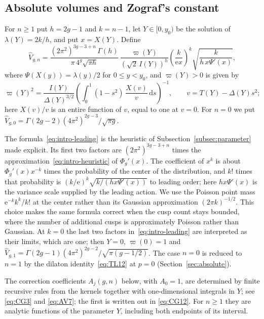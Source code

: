\subsection{Absolute volumes and Zograf's constant}
For $n\ge1$ put $h=2g-1$ and $k=n-1$, let $Y\in[0,y_0)$ be the solution of $\lambda(Y)=2k/h$, and put $x=X(Y)$. Define
\begin{equation}
 \widehat V_{g,n}=\frac{(2\pi^2)^{3g-3+n}\,\Gamma(h)}{\pi\,4^g\sqrt{\pi h}}\,
 \frac{\varpi(Y)}{(\sqrt2\,I(Y))^{h}}
 \left(\frac{k}{\mathrm e x}\right)^{k}
 \sqrt{\frac{k}{h\,x\Psi'(x)}},
 \label{eq:intro-leading}
\end{equation}
where $\Psi(X(y))=\lambda(y)/2$ for $0\le y<y_0$, and $\varpi(Y)>0$ is given by
\begin{equation}
 \varpi(Y)^2=\frac{I(Y)}{\Delta(Y)^{3/2}}
 \left(\int_0^1(1-s^2)\,\frac{X(v)}{v}\,\mathrm ds\right)^{-1},
 \qquad v=T(Y)-\Delta(Y)s^2;
 \label{eq:intro-varpi}
\end{equation}
here $X(v)/v$ is an entire function of $v$, equal to one at $v=0$. For $n=0$ we put $\widehat V_{g,0}=\Gamma(2g-2)(4\pi^2)^{2g-3}/\sqrt{\pi g}$.

The formula~\eqref{eq:intro-leading} is the heuristic of Subsection~\ref{subsec:parameter} made explicit. Its first two factors are $(2\pi^2)^{3g-3+n}$ times the approximation~\eqref{eq:intro-heuristic} of $\Phi_g'(x)$. The coefficient of $x^k$ is about $\Phi_g'(x)x^{-k}$ times the probability of the center of the distribution, and $k!$ times that probability is $(k/\mathrm e)^k\sqrt{k/(hx\Psi'(x))}$ to leading order; here $hx\Psi'(x)$ is the variance scale supplied by the leading action. We use the Poisson point mass $\mathrm e^{-k}k^k/k!$ at the center rather than its Gaussian approximation $(2\pi k)^{-1/2}$. This choice makes the same formula correct when the cusp count stays bounded, where the number of additional cusps is approximately Poisson rather than Gaussian. At $k=0$ the last two factors in~\eqref{eq:intro-leading} are interpreted as their limits, which are one; then $Y=0$, $\varpi(0)=1$ and $\widehat V_{g,1}=\Gamma(2g-1)(4\pi^2)^{2g-2}/\sqrt{\pi(g-1/2)}$. The case $n=0$ is reduced to $n=1$ by the dilaton identity~\eqref{eq:TL12} at $p=0$ (Section~\ref{sec:absolute}).

The correction coefficients $A_j(g,n)$ below, with $A_0=1$, are determined by finite recursive rules from the kernels together with one-dimensional integrals in $Y$; see \eqref{eq:CG3} and \eqref{eq:AV7}; the first is written out in \eqref{eq:CG12}. For $n\ge1$ they are analytic functions of the parameter $Y$, including both endpoints of its interval.

